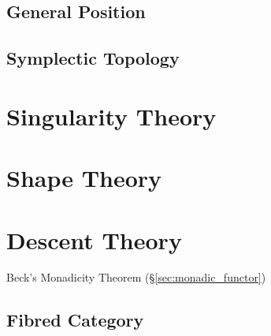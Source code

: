 \subsection{General Position}\label{sec:general_position}

\subsection{Symplectic Topology}\label{sec:symplectic_topology}



\section{Singularity Theory}\label{sec:singularity_theory}

\section{Shape Theory}\label{sec:shape_theory}

\section{Descent Theory}\label{sec:descent_theory}

Beck's Monadicity Theorem (\S\ref{sec:monadic_functor})



\subsection{Fibred Category}\label{sec:fibred_category}



